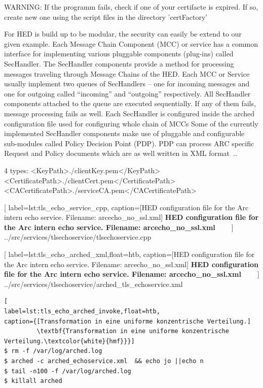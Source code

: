 WARNING: If the programm fails, check if one of your certifacte is expired. If so, create new one using the script files in the directory 'certFactory'

For HED is build up to  %
be modular, the security can easily be extend to our given example.
Each Message Chain Component (MCC) or service has a common interface for implementing various pluggable components (plug-ins) called SecHandler. The SecHandler components provide a method for processing messages traveling through Message Chains of the HED. 
Each MCC or Service usually implement two queues of SecHandlers – one for incoming messages and one for outgoing called “incoming” and “outgoing” respectively. All SecHandler components attached to the queue are executed sequentially. 
If any of them fails, message processing fails as well. 
Each SecHandler is configured inside the arched configuration file used for configuring whole chain of MCCs 
Some of the currently implemented SecHandler components make use of pluggable and configurable sub-modules called Policy Decision Point (PDP). PDP can process ARC specific Request and Policy documents which are as well written in XML format~\cite{QIANG_2008}..




4 types:
                <KeyPath>./clientKey.pem</KeyPath>
                <CertificatePath>./clientCert.pem</CertificatePath>
                <CACertificatePath>./serviceCA.pem</CACertificatePath>


	[
	label=lst:tls_echo_service_cpp,
	caption={[HED configuration file for the Arc intern echo service. Filename: arcecho\_no\_ssl.xml]
	\textbf{HED configuration file for the Arc intern echo service. Filename: arcecho\_no\_ssl.xml\textcolor{white}{hmf}}}
	]
{../src/services/tlsechoservice/tlsechoservice.cpp}





	[
	label=lst:tls_echo_arched_xml,float=htb,
	caption={[HED configuration file for the Arc intern echo service. Filename: arcecho\_no\_ssl.xml]
	\textbf{HED configuration file for the Arc intern echo service. Filename: arcecho\_no\_ssl.xml\textcolor{white}{hmf}}}
	]
{../src/services/tlsechoservice/arched_tls_echoservice.xml}


\begin{lstlisting}[
label=lst:tls_echo_arched_invoke,float=htb,
caption={[Transformation in eine uniforme konzentrische Verteilung.]
         \textbf{Transformation in eine uniforme konzentrische Verteilung.\textcolor{white}{hmf}}}]
$ rm -f /var/log/arched.log
$ arched -c arched_echoservice.xml  && echo jo ||echo n
$ tail -n100 -f /var/log/arched.log
$ killall arched
\end{lstlisting}




